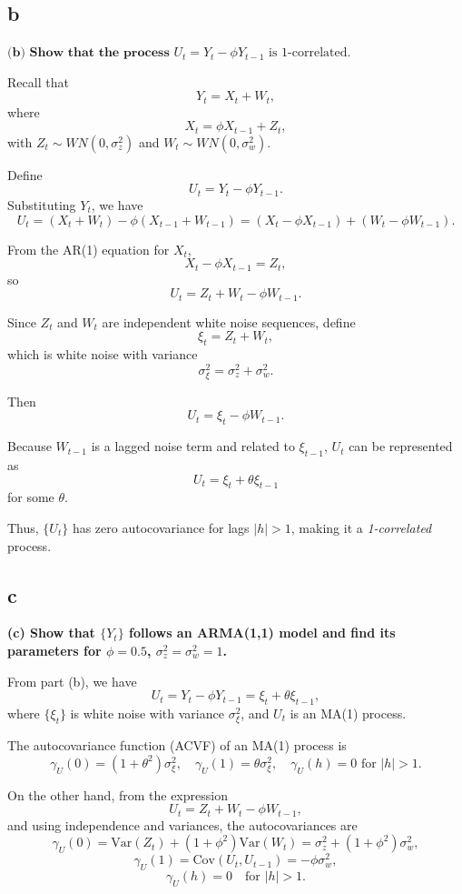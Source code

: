 \documentclass{article}
\begin{document}
\subsection{b}

$\textbf{(b) Show that the process } U_t = Y_t - \phi Y_{t-1} \text{ is 1-correlated.}$

\vspace{6pt}

\noindent Recall that
\[
Y_t = X_t + W_t,
\]
where
\[
X_t = \phi X_{t-1} + Z_t,
\]
with \( Z_t \sim WN(0, \sigma_z^2) \) and \( W_t \sim WN(0, \sigma_w^2) \).

Define
\[
U_t = Y_t - \phi Y_{t-1}.
\]
Substituting \( Y_t \), we have
\[
U_t = (X_t + W_t) - \phi (X_{t-1} + W_{t-1}) = (X_t - \phi X_{t-1}) + (W_t - \phi W_{t-1}).
\]

From the AR(1) equation for \( X_t \),
\[
X_t - \phi X_{t-1} = Z_t,
\]
so
\[
U_t = Z_t + W_t - \phi W_{t-1}.
\]

Since \( Z_t \) and \( W_t \) are independent white noise sequences, define
\[
\xi_t = Z_t + W_t,
\]
which is white noise with variance
\[
\sigma_\xi^2 = \sigma_z^2 + \sigma_w^2.
\]

Then
\[
U_t = \xi_t - \phi W_{t-1}.
\]

Because \( W_{t-1} \) is a lagged noise term and related to \( \xi_{t-1} \), \( U_t \) can be represented as
\[
U_t = \xi_t + \theta \xi_{t-1}
\]
for some \( \theta \).

Thus, \( \{U_t\} \) has zero autocovariance for lags \( |h| > 1 \), making it a \emph{1-correlated} process.
\subsection{c}
\textbf{(c) Show that \( \{Y_t\} \) follows an ARMA(1,1) model and find its parameters for \( \phi = 0.5 \), \( \sigma_z^2 = \sigma_w^2 = 1 \).}

\vspace{6pt}

From part (b), we have
\[
U_t = Y_t - \phi Y_{t-1} = \xi_t + \theta \xi_{t-1},
\]
where \( \{\xi_t\} \) is white noise with variance \( \sigma_\xi^2 \), and \( U_t \) is an MA(1) process.

The autocovariance function (ACVF) of an MA(1) process is
\[
\gamma_U(0) = (1 + \theta^2) \sigma_\xi^2, \quad \gamma_U(1) = \theta \sigma_\xi^2, \quad \gamma_U(h) = 0 \text{ for } |h| > 1.
\]

On the other hand, from the expression
\[
U_t = Z_t + W_t - \phi W_{t-1},
\]
and using independence and variances, the autocovariances are
\[
\gamma_U(0) = \mathrm{Var}(Z_t) + (1 + \phi^2) \mathrm{Var}(W_t) = \sigma_z^2 + (1 + \phi^2) \sigma_w^2,
\]
\[
\gamma_U(1) = \mathrm{Cov}(U_t, U_{t-1}) = -\phi \sigma_w^2,
\]
\[
\gamma_U(h) = 0 \quad \text{for } |h| > 1.
\]
\end{document}
